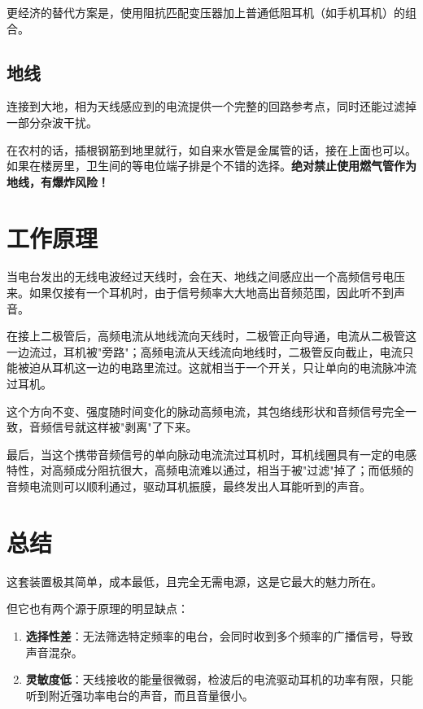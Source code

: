 \documentclass[12pt,UTF8]{ctexbook}
\begin{document}
更经济的替代方案是，使用阻抗匹配变压器加上普通低阻耳机（如手机耳机）的组合。

\subsection{地线}

连接到大地，相为天线感应到的电流提供一个完整的回路参考点，同时还能过滤掉一部分杂波干扰。

在农村的话，插根钢筋到地里就行，如自来水管是金属管的话，接在上面也可以。如果在楼房里，卫生间的等电位端子排是个不错的选择。\textbf{绝对禁止使用燃气管作为地线，有爆炸风险！}

\section{工作原理}

当电台发出的无线电波经过天线时，会在天、地线之间感应出一个高频信号电压来。如果仅接有一个耳机时，由于信号频率大大地高出音频范围，因此听不到声音。

在接上二极管后，高频电流从地线流向天线时，二极管正向导通，电流从二极管这一边流过，耳机被"旁路"；高频电流从天线流向地线时，二极管反向截止，电流只能被迫从耳机这一边的电路里流过。这就相当于一个开关，只让单向的电流脉冲流过耳机。

这个方向不变、强度随时间变化的脉动高频电流，其包络线形状和音频信号完全一致，音频信号就这样被"剥离"了下来。

最后，当这个携带音频信号的单向脉动电流流过耳机时，耳机线圈具有一定的电感特性，对高频成分阻抗很大，高频电流难以通过，相当于被"过滤"掉了；而低频的音频电流则可以顺利通过，驱动耳机振膜，最终发出人耳能听到的声音。

\section{总结}

这套装置极其简单，成本最低，且完全无需电源，这是它最大的魅力所在。

但它也有两个源于原理的明显缺点：

\begin{enumerate}[leftmargin=2cm]
	\item \textbf{选择性差}：无法筛选特定频率的电台，会同时收到多个频率的广播信号，导致声音混杂。
	\item \textbf{灵敏度低}：天线接收的能量很微弱，检波后的电流驱动耳机的功率有限，只能听到附近强功率电台的声音，而且音量很小。
\end{enumerate}
\end{document}
